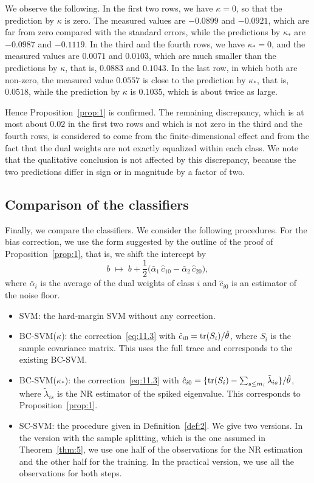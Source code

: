 We observe the following. In the first two rows, we have $\kappa=0$, so that the
prediction by $\kappa$ is zero. The measured values are $-0.0899$ and $-0.0921$,
which are far from zero compared with the standard errors, while the predictions
by $\kappa_*$ are $-0.0987$ and $-0.1119$. In the third and the fourth rows, we
have $\kappa_*=0$, and the measured values are $0.0071$ and $0.0103$, which are
much smaller than the predictions by $\kappa$, that is, $0.0883$ and $0.1043$. In
the last row, in which both are non-zero, the measured value $0.0557$ is close to
the prediction by $\kappa_*$, that is, $0.0518$, while the prediction by $\kappa$
is $0.1035$, which is about twice as large.

Hence Proposition~\ref{prop:1} is confirmed. The remaining discrepancy, which is
at most about $0.02$ in the first two rows and which is not zero in the third and
the fourth rows, is considered to come from the finite-dimensional effect and from
the fact that the dual weights are not exactly equalized within each class. We
note that the qualitative conclusion is not affected by this discrepancy, because
the two predictions differ in sign or in magnitude by a factor of two.

\subsection{Comparison of the classifiers}
\label{sec:sim-classifiers}

Finally, we compare the classifiers. We consider the following procedures. For
the bias correction, we use the form suggested by the outline of the proof of
Proposition~\ref{prop:1}, that is, we shift the intercept by
\begin{equation}
b\;\longmapsto\;
b+\frac12\bigl(\bar\alpha_1\,\hat c_{10}-\bar\alpha_2\,\hat c_{20}\bigr),
\label{eq:11.3}
\end{equation}
where $\bar\alpha_i$ is the average of the dual weights of class $i$ and
$\hat c_{i0}$ is an estimator of the noise floor.

\begin{itemize}
\item SVM: the hard-margin SVM without any correction.
\item BC-SVM($\kappa$): the correction~\eqref{eq:11.3} with
$\hat c_{i0}=\operatorname{tr}(S_i)/\hat\theta$, where $S_i$ is the sample covariance matrix.
This uses the full trace and corresponds to the existing BC-SVM.
\item BC-SVM($\kappa_*$): the correction~\eqref{eq:11.3} with
$\hat c_{i0}=\{\operatorname{tr}(S_i)-\sum_{s\le m_i}\tilde\lambda_{is}\}/\hat\theta$, where
$\tilde\lambda_{is}$ is the NR estimator of the spiked eigenvalue. This
corresponds to Proposition~\ref{prop:1}.
\item SC-SVM: the procedure given in Definition~\ref{def:2}. We give two versions.
In the version with the sample splitting, which is the one assumed in
Theorem~\ref{thm:5}, we use one half of the observations for the NR estimation and
the other half for the training. In the practical version, we use all the
observations for both steps.
\end{itemize}

